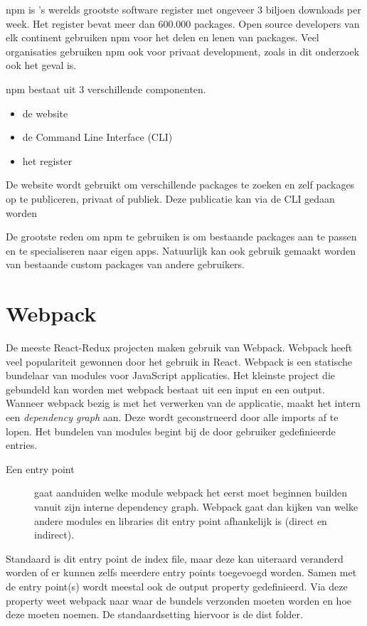 npm is 's werelds grootste software register met ongeveer 3 biljoen downloads per week. Het register bevat meer dan 600.000 packages. Open source developers van elk continent gebruiken npm voor het delen en lenen van packages. Veel organisaties gebruiken npm ook voor privaat development, zoals in dit onderzoek ook het geval is. 

npm bestaat uit 3 verschillende componenten.
\begin{itemize}
	\item de website
	\item de Command Line Interface (CLI)
	\item het register
	
\end{itemize}

De website wordt gebruikt om verschillende packages te zoeken en zelf packages op te publiceren, privaat of publiek. Deze publicatie kan via de CLI gedaan worden

De grootste reden om npm te gebruiken is om bestaande packages aan te passen en te specialiseren naar eigen apps. Natuurlijk kan ook gebruik gemaakt worden van bestaande custom packages van andere gebruikers.
\autocite{npm}

\section{Webpack}
De meeste React-Redux projecten maken gebruik van Webpack. Webpack heeft veel populariteit gewonnen door het gebruik in React. Webpack is een statische bundelaar van modules voor JavaScript applicaties. Het kleinste project die gebundeld kan worden met webpack bestaat uit een input en een output. Wanneer webpack bezig is met het verwerken van de applicatie, maakt het intern een \textit{dependency graph} aan. Deze wordt geconstrueerd door alle imports af te lopen. Het bundelen van modules begint bij de door gebruiker gedefinieerde entries.
\begin{description}
	\item[Een entry point] 
	 gaat aanduiden welke module webpack het eerst moet beginnen builden vanuit zijn interne dependency graph. Webpack gaat dan kijken van welke andere modules en libraries dit entry point afhankelijk is (direct en indirect). 
\end{description}

Standaard is dit entry point de index file, maar deze kan uiteraard veranderd worden of er kunnen zelfs meerdere entry points toegevoegd worden. Samen met de entry point(s) wordt meestal ook de output property gedefinieerd. Via deze property weet webpack naar waar de bundels verzonden moeten worden en hoe deze moeten noemen. De standaardsetting hiervoor is de dist folder.

